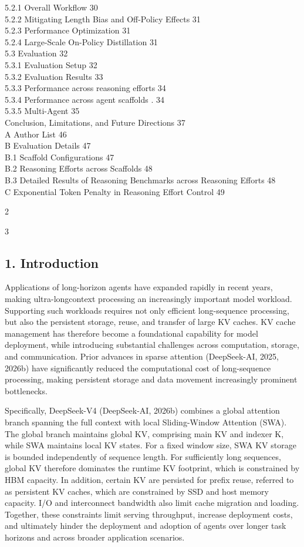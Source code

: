 \documentclass[
  10
]{article}
\begin{document}
5.2.1 Overall Workflow 30\\
5.2.2 Mitigating Length Bias and Off-Policy Effects 31\\
5.2.3 Performance Optimization 31\\
5.2.4 Large-Scale On-Policy Distillation 31\\
5.3 Evaluation 32\\
5.3.1 Evaluation Setup 32\\
5.3.2 Evaluation Results 33\\
5.3.3 Performance across reasoning efforts 34\\
5.3.4 Performance across agent scaffolds . 34\\
5.3.5 Multi-Agent 35\\
Conclusion, Limitations, and Future Directions 37\\
A Author List 46\\
B Evaluation Details 47\\
B.1 Scaffold Configurations 47\\
B.2 Reasoning Efforts across Scaffolds 48\\
B.3 Detailed Results of Reasoning Benchmarks across Reasoning Efforts
48\\
C Exponential Token Penalty in Reasoning Effort Control 49

2

3

\subsection{1. Introduction}\label{introduction}

Applications of long-horizon agents have expanded rapidly in recent
years, making ultra-longcontext processing an increasingly important
model workload. Supporting such workloads requires not only efficient
long-sequence processing, but also the persistent storage, reuse, and
transfer of large KV caches. KV cache management has therefore become a
foundational capability for model deployment, while introducing
substantial challenges across computation, storage, and communication.
Prior advances in sparse attention (DeepSeek-AI, 2025, 2026b) have
significantly reduced the computational cost of long-sequence
processing, making persistent storage and data movement increasingly
prominent bottlenecks.

Specifically, DeepSeek-V4 (DeepSeek-AI, 2026b) combines a global
attention branch spanning the full context with local Sliding-Window
Attention (SWA). The global branch maintains global KV, comprising main
KV and indexer K, while SWA maintains local KV states. For a fixed
window size, SWA KV storage is bounded independently of sequence length.
For sufficiently long sequences, global KV therefore dominates the
runtime KV footprint, which is constrained by HBM capacity. In addition,
certain KV are persisted for prefix reuse, referred to as persistent KV
caches, which are constrained by SSD and host memory capacity. I/O and
interconnect bandwidth also limit cache migration and loading. Together,
these constraints limit serving throughput, increase deployment costs,
and ultimately hinder the deployment and adoption of agents over longer
task horizons and across broader application scenarios.
\end{document}
